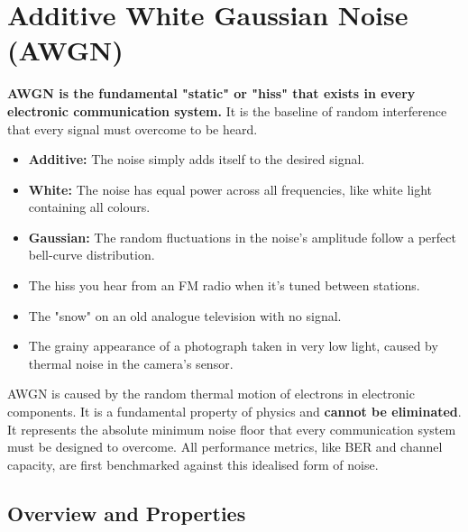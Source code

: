 
\chapter{Additive White Gaussian Noise (AWGN)}
\label{ch:awgn}

\begin{nontechnical}
    \textbf{AWGN is the fundamental "static" or "hiss" that exists in every electronic communication system.} It is the baseline of random interference that every signal must overcome to be heard.

    \begin{itemize}
        \item \textbf{Additive:} The noise simply adds itself to the desired signal.
        \item \textbf{White:} The noise has equal power across all frequencies, like white light containing all colours.
        \item \textbf{Gaussian:} The random fluctuations in the noise's amplitude follow a perfect bell-curve distribution.
    \end{itemize}

    \begin{itemize}
        \item The hiss you hear from an FM radio when it's tuned between stations.
        \item The "snow" on an old analogue television with no signal.
        \item The grainy appearance of a photograph taken in very low light, caused by thermal noise in the camera's sensor.
    \end{itemize}

     AWGN is caused by the random thermal motion of electrons in electronic components. It is a fundamental property of physics and \textbf{cannot be eliminated}. It represents the absolute minimum noise floor that every communication system must be designed to overcome. All performance metrics, like BER and channel capacity, are first benchmarked against this idealised form of noise.
\end{nontechnical}


\section{Overview and Properties}

